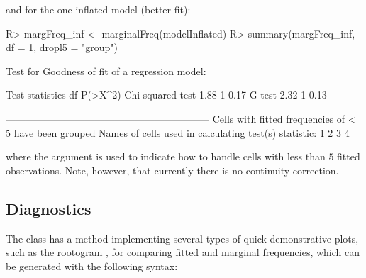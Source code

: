 \documentclass[
]{jss}
\newcommand{\1}{\mathcal{I}} \newcommand{\bZero}{\boldsymbol{0}}
\begin{document}
and for the one-inflated model (better fit):

\begin{CodeChunk}
\begin{CodeInput}
R> margFreq_inf <- marginalFreq(modelInflated)
R> summary(margFreq_inf, df = 1, dropl5 = "group")
\end{CodeInput}
\begin{CodeOutput}
Test for Goodness of fit of a regression model:

                 Test statistics df P(>X^2)
Chi-squared test            1.88  1    0.17
G-test                      2.32  1    0.13

-------------------------------------------------------------- 
Cells with fitted frequencies of < 5 have been grouped 
Names of cells used in calculating test(s) statistic: 1 2 3 4  
\end{CodeOutput}
\end{CodeChunk}

where the  argument is used to indicate how to handle cells
with less than \(5\) fitted observations. Note, however, that currently
there is no continuity correction.

\subsection{Diagnostics}\label{diagnostics}

The  class has a  method
implementing several types of quick demonstrative plots, such as the
rootogram \citep[cf.][]{rootogram}, for comparing fitted and marginal
frequencies, which can be generated with the following syntax:
\end{document}

